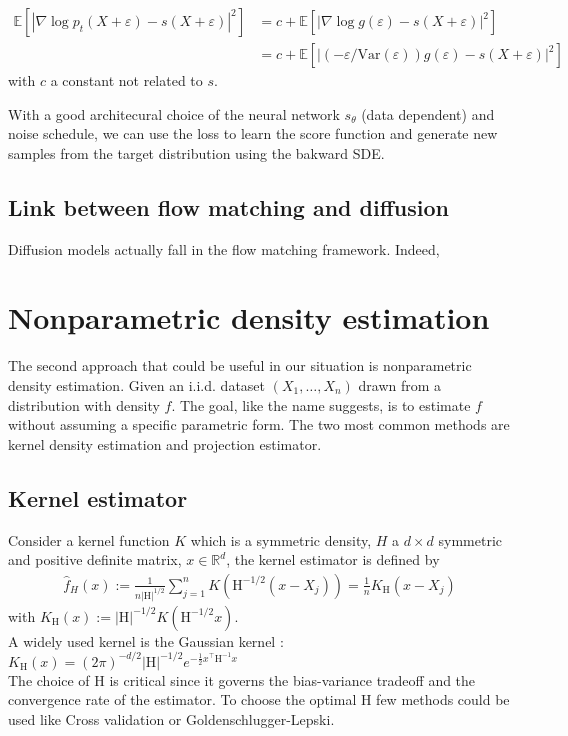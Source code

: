 \documentclass{article}
\begin{document}
\begin{align}
    \mathbb{E}[|\nabla \log p_t (X+\varepsilon)-s(X+\varepsilon)|^2]&=c+\mathbb{E}[|\nabla \log g(\varepsilon)-s(X+\varepsilon)|^2]\\
    &=c+\mathbb{E}[|(-\varepsilon/\text{Var} (\varepsilon))g(\varepsilon)-s(X+\varepsilon)|^2]
\end{align}
with \(c\) a constant not related to \(s\).

With a good architecural choice of the neural network \(s_\theta\) (data dependent) and noise schedule, we can use the loss to learn the score function and generate new samples from the target distribution using the bakward SDE.

\subsection{Link between flow matching and diffusion}
Diffusion models actually fall in the flow matching framework. Indeed, 

\section{Nonparametric density estimation}
The second approach that could be useful in our situation is nonparametric density estimation. Given an i.i.d. dataset \((X_1,\ldots,X_n)\) drawn from a distribution with density \(f\). The goal, like the name suggests, is to estimate \(f\) without assuming a specific parametric form. The two most common methods are kernel density estimation and projection estimator. 

\subsection{Kernel estimator}
Consider a kernel function \(K\) which is a symmetric density, \(H\) a \(d\times d\) symmetric and positive definite matrix, \(x\in\mathbb{R}^d\), the kernel estimator is defined by 
\begin{align}
\hat{f}_H(x):=\frac{1}{n|\mathrm{H}|^{1/2}}\sum_{j=1}^n K\left(\mathrm{H}^{-1/2}(x-X_j)\right)=\frac{1}{n}K_\mathrm{H}\left(x-X_j\right)
\end{align}
with \(K_\mathrm{H}(x):= |\mathrm{H}|^{-1/2}K(\mathrm{H}^{-1/2}x)\). \\
A widely used kernel is the Gaussian kernel : \(K_\textrm{H}(x)=(2\pi)^{-d/2}|\textrm{H}|^{-1/2}e^{-\frac{1}{2} x^\intercal \textrm{H}^{-1} x}\) \\
The choice of \(\mathrm{H}\) is critical since it governs the bias-variance tradeoff and the convergence rate of the estimator. To choose the optimal \(\mathrm{H}\) few methods could be used like Cross validation or Goldenschlugger-Lepski.
\end{document}

